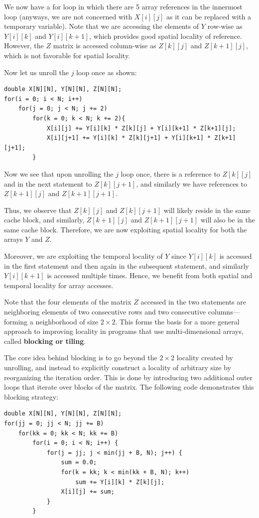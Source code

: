 \documentclass[12pt]{book}
\begin{document}
We now have a for loop in which there are 5 array references in the innermost loop (anyways, we are not concerned with $X[i][j]$ as it can be replaced with a temporary variable). Note that we are accessing the elements of $Y$ row-wise as $Y[i][k]$ and $Y[i][k+1]$, which provides good spatial locality of reference. However, the $Z$ matrix is accessed column-wise as $Z[k][j]$ and $Z[k+1][j]$, which is not favorable for spatial locality.

Now let us unroll the $j$ loop once as shown:
\begin{lstlisting}[style=cppstyle]
double X[N][N], Y[N][N], Z[N][N];
for(i = 0; i < N; i++)
    for(j = 0; j < N; j += 2)
        for(k = 0; k < N; k += 2){
            X[i][j] += Y[i][k] * Z[k][j] + Y[i][k+1] * Z[k+1][j];
            X[i][j+1] += Y[i][k] * Z[k][j+1] + Y[i][k+1] * Z[k+1][j+1];
        }
\end{lstlisting}
Now we see that upon unrolling the $j$ loop once, there is a reference to $Z[k][j]$ and in the next statement to $Z[k][j+1]$, and similarly we have references to $Z[k+1][j]$ and $Z[k+1][j+1]$. 

Thus, we observe that $Z[k][j]$ and $Z[k][j+1]$ will likely reside in the same cache block, and similarly, $Z[k+1][j]$ and $Z[k+1][j+1]$ will also be in the same cache block. Therefore, we are now exploiting spatial locality for both the arrays $Y$ and $Z$.

Moreover, we are exploiting the temporal locality of $Y$ since $Y[i][k]$ is accessed in the first statement and then again in the subsequent statement, and similarly $Y[i][k+1]$ is accessed multiple times. Hence, we benefit from both spatial and temporal locality for array accesses.

Note that the four elements of the matrix $Z$ accessed in the two statements are neighboring elements of two consecutive rows and two consecutive columns—forming a neighborhood of size $2 \times 2$. This forms the basis for a more general approach to improving locality in programs that use multi-dimensional arrays, called \textbf{blocking or tiling}. 

The core idea behind blocking is to go beyond the $2 \times 2$ locality created by unrolling, and instead to explicitly construct a locality of arbitrary size by reorganizing the iteration order. This is done by introducing two additional outer loops that iterate over blocks of the matrix. The following code demonstrates this blocking strategy:

\begin{lstlisting}[style=cppstyle,  caption=Blocking or Tiling]
double X[N][N], Y[N][N], Z[N][N];
for(jj = 0; jj < N; jj += B)
    for(kk = 0; kk < N; kk += B)
        for(i = 0; i < N; i++) {
            for(j = jj; j < min(jj + B, N); j++) {
                sum = 0.0;
                for(k = kk; k < min(kk + B, N); k++)
                    sum += Y[i][k] * Z[k][j];
                X[i][j] += sum;
            }
        }
\end{lstlisting}
\end{document}
